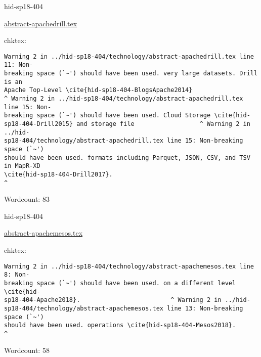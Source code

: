 

\begin{IU}

hid-sp18-404

\href{https://github.com/cloudmesh-community/hid-sp18-404/blob/master//technology/abstract-apachedrill.tex}{abstract-apachedrill.tex}

 
chktex:
\begin{tiny}
\begin{verbatim}
Warning 2 in ../hid-sp18-404/technology/abstract-apachedrill.tex line 11: Non-
breaking space (`~') should have been used. very large datasets. Drill is an
Apache Top-Level \cite{hid-sp18-404-BlogsApache2014}
^ Warning 2 in ../hid-sp18-404/technology/abstract-apachedrill.tex line 15: Non-
breaking space (`~') should have been used. Cloud Storage \cite{hid-
sp18-404-Drill2015} and storage file                  ^ Warning 2 in ../hid-
sp18-404/technology/abstract-apachedrill.tex line 15: Non-breaking space (`~')
should have been used. formats including Parquet, JSON, CSV, and TSV in MapR-XD
\cite{hid-sp18-404-Drill2017}.
^
\end{verbatim}
\end{tiny}

Wordcount: 83

\end{IU}



\begin{IU}

hid-sp18-404

\href{https://github.com/cloudmesh-community/hid-sp18-404/blob/master//technology/abstract-apachemesos.tex}{abstract-apachemesos.tex}

 
chktex:
\begin{tiny}
\begin{verbatim}
Warning 2 in ../hid-sp18-404/technology/abstract-apachemesos.tex line 8: Non-
breaking space (`~') should have been used. on a different level \cite{hid-
sp18-404-Apache2018}.                         ^ Warning 2 in ../hid-
sp18-404/technology/abstract-apachemesos.tex line 13: Non-breaking space (`~')
should have been used. operations \cite{hid-sp18-404-Mesos2018}.              ^
\end{verbatim}
\end{tiny}

Wordcount: 58

\end{IU}

